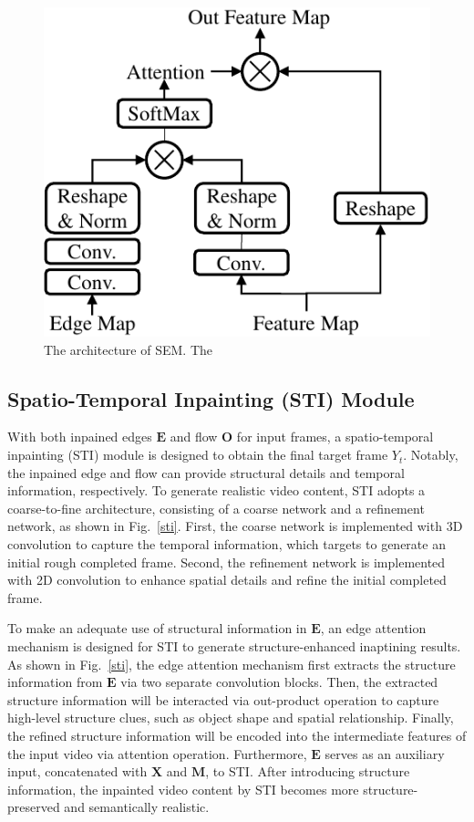 \begin{figure}[t]
	\centering
	\includegraphics[width=0.7\columnwidth]{SEM} %
	\caption{The architecture of SEM. The }
	\label{SEM}
\end{figure}




\subsection{Spatio-Temporal Inpainting (STI) Module}

With both inpained edges $\boldsymbol{E}$ and flow $\boldsymbol{O}$ for input frames, a spatio-temporal inpainting (STI) module is designed to obtain the final target frame $Y_t$.
Notably, the inpained edge and flow can provide structural details and temporal information, respectively.
To generate realistic video content, STI adopts a coarse-to-fine architecture, consisting of a coarse network and a refinement network, as shown in Fig.~\ref{sti}.
First, the coarse network is implemented with 3D convolution to capture the temporal information, which targets to generate an initial rough completed frame.
Second, the refinement network is implemented with 2D convolution to enhance spatial details and refine the initial completed frame.

To make an adequate use of structural information in $\boldsymbol{E}$, an edge attention mechanism is designed for STI to generate structure-enhanced inaptining results.
As shown in Fig.~\ref{sti}, the edge attention mechanism first extracts the structure information from $\boldsymbol{E}$ via two separate convolution blocks.
Then, the extracted structure information will be interacted via out-product operation to capture high-level structure clues, such as object shape and spatial relationship.
Finally, the refined structure information will be encoded into the intermediate features of the input video via attention operation.
Furthermore, $\boldsymbol{E}$ serves as an auxiliary input, concatenated with $\boldsymbol{X}$ and $\boldsymbol{M}$, to STI.
After introducing structure information, the inpainted video content by STI becomes more structure-preserved and semantically realistic.

